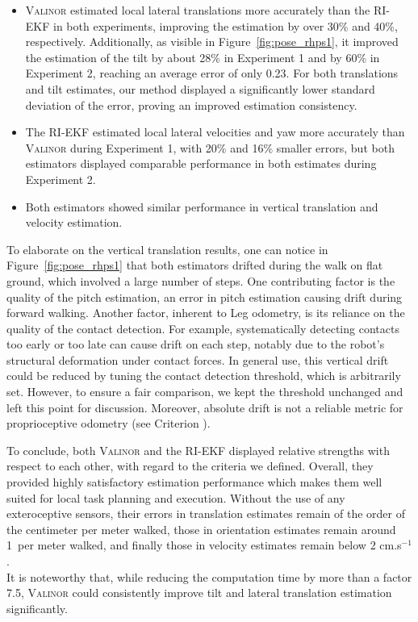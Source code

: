 \documentclass{IJCAS}
\newcommand{\critnum}[1]{\tikz[baseline=(char.base)]{
            \node[shape=circle,draw,inner sep=1pt](char){\textbf{#1}};}}
\begin{document}
\begin{itemize}
    \item {\scshape Valinor} estimated local lateral translations {\footnotesize\critnum{3}} more accurately than the RI-EKF in both experiments, improving the estimation by over 30\% and 40\%, respectively. Additionally, as visible in Figure~\ref{fig:pose_rhps1}, it improved the estimation of the tilt {\footnotesize\critnum{2}} by about 28\% in Experiment 1 and by 60\% in Experiment 2, reaching an average error of only 0.23\textdegree. For both translations and tilt estimates, our method displayed a significantly lower standard deviation of the error, proving an improved estimation consistency. 
    \item The RI-EKF estimated local lateral velocities {\footnotesize\critnum{2}} and yaw {\footnotesize\critnum{3}} more accurately than {\scshape Valinor} during Experiment 1, with 20\% and 16\% smaller errors, but both estimators displayed comparable performance in both estimates during Experiment 2.
    \item Both estimators showed similar performance in vertical translation {\footnotesize\critnum{3}} and velocity estimation. 
\end{itemize}
To elaborate on the vertical translation results, one can notice in Figure~\ref{fig:pose_rhps1} that both estimators drifted during the walk on flat ground, which involved a large number of steps. One contributing factor is the quality of the pitch estimation, an error in pitch estimation causing drift during forward walking. Another factor, inherent to Leg odometry, is its reliance on the quality of the contact detection. For example, systematically detecting contacts too early or too late can cause drift on each step, notably due to the robot's structural deformation under contact forces. In general use, this vertical drift could be reduced by tuning the contact detection threshold, which is arbitrarily set. However, to ensure a fair comparison, we kept the threshold unchanged and left this point for discussion. Moreover, absolute drift is not a reliable metric for proprioceptive odometry (see Criterion \critnum{3}).

To conclude, both {\scshape Valinor} and the RI-EKF displayed relative strengths with respect to each other, with regard to the criteria we defined. Overall, they provided highly satisfactory estimation performance which makes them well suited for local task planning and execution. Without the use of any exteroceptive sensors, their errors in translation estimates remain of the order of the centimeter per meter walked, those in orientation estimates remain around 1\textdegree \ per meter walked, and finally those in velocity estimates remain below 2 cm.s$^{-1}$. \\
It is noteworthy that, while reducing the computation time by more than a factor 7.5, {\scshape Valinor} could consistently improve tilt and lateral translation estimation significantly.
\end{document}
